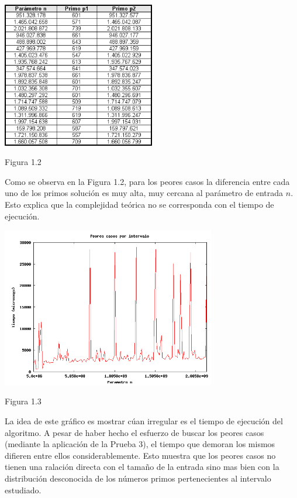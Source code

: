 \documentclass[a4paper,10pt] {article}
\begin{document}
\begin{center}
 \includegraphics[width=0.5\textwidth]{Plots/Ej1-MayoresPrimos.png}
\begin{center}
Figura 1.2
\end{center}
\end{center}

Como se observa en la Figura 1.2, para los peores casos la diferencia entre cada uno de los primos soluci\'on es muy alta, muy cercana al par\'ametro de entrada $n$. Esto explica que la complejidad te\'orica no se corresponda con el tiempo de ejecuci\'on.

\begin{center}
 \includegraphics[width=0.7\textwidth]{Plots/Ej1-PeoresCasos.png}
\begin{center}
Figura 1.3
\end{center}
\end{center}

La idea de este gr\'afico es mostrar c\'uan irregular es el tiempo de ejecuci\'on del algoritmo. A pesar de haber hecho el esfuerzo de buscar los peores casos (mediante la aplicaci\'on de la Prueba 3), el tiempo que demoran los mismos difieren entre ellos considerablemente. Esto muestra que los peores casos no tienen una ralaci\'on directa con el tama\~{n}o de la entrada sino mas bien con la distribuci\'on desconocida de los n\'umeros primos pertenecientes al intervalo estudiado.
\end{document}
